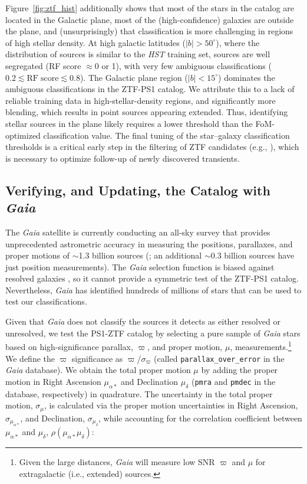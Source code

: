 \documentclass[twocolumn]{aastex62}
\begin{document}
\begin{CJK*}{UTF8}{gbsn}
Figure~\ref{fig:ztf_hist} additionally shows that most of the stars in the
catalog are located in the Galactic plane, most of the (high-confidence)
galaxies are outside the plane, and (unsurprisingly) that classification is
more challenging in regions of high stellar density. At high galactic
latitudes ($|b| > 50^{\circ}$), where the distribution of sources is similar
to the \textit{HST} training set, sources are well segregated (RF score
$\approx$0 or 1), with very few ambiguous classifications ($0.2 \lesssim
\mathrm{RF\;score} \lesssim 0.8$). The Galactic plane region ($|b| <
15^{\circ}$) dominates the ambiguous classifications in the ZTF-PS1 catalog.
We attribute this to a lack of reliable training data in
high-stellar-density regions, and significantly more blending, which results
in point sources appearing extended. Thus, identifying stellar sources in
the plane likely requires a lower threshold than the FoM-optimized
classification value. The final tuning of the star--galaxy classification
thresholds is a critical early step in the filtering of ZTF candidates
(e.g., \citealt{Kasliwal:18:ZTF}), which is necessary to optimize follow-up
of newly discovered transients.

\subsection{Verifying, and Updating, the Catalog with \textit{Gaia}}
\label{sec:gaia}

The \textit{Gaia} satellite \citep{Gaia-Collaboration16} is currently
conducting an all-sky survey that provides unprecedented astrometric
accuracy in measuring the positions, parallaxes, and proper motions of
$\sim$1.3 billion sources (\citealt{Gaia-Collaboration18}; an additional
$\sim$0.3 billion sources have just position measurements). The
\textit{Gaia} selection function is biased against resolved galaxies
\citep{Gaia-Collaboration16}, so it cannot provide a symmetric test of the
ZTF-PS1 catalog. Nevertheless, \textit{Gaia} has identified hundreds of
millions of stars that can be used to test our classifications.

Given that \textit{Gaia} does not classify the sources it detects as either
resolved or unresolved, we test the PS1-ZTF catalog by selecting a pure
sample of \textit{Gaia} stars based on high-significance parallax, $\varpi$,
and proper motion, $\mu$, measurements.\footnote{Given the large distances, \textit{Gaia} will measure low SNR $\varpi$ and $\mu$ for extragalactic (i.e., extended) sources.} We define the
$\varpi$ significance as $\varpi$/$\sigma_\varpi$ (called
\texttt{parallax\_over\_error} in the \textit{Gaia} database). We obtain the
total proper motion $\mu$ by adding the proper motion in Right Ascension
$\mu_{\alpha\ast}$ and Declination $\mu_{\delta}$ (\texttt{pmra} and
\texttt{pmdec} in the database, respectively) in quadrature. The uncertainty
in the total proper motion, $\sigma_\mu$,
is calculated via the proper motion uncertainties in Right Ascension, $\sigma_{\mu_{\alpha\ast}}$, and
Declination, $\sigma_{\mu_{\delta}}$, while accounting for the correlation coefficient between
$\mu_{\alpha\ast}$ and $\mu_{\delta}$, $\rho(\mu_{\alpha\ast}\mu_{\delta})$:


\end{CJK*}
\end{document}
